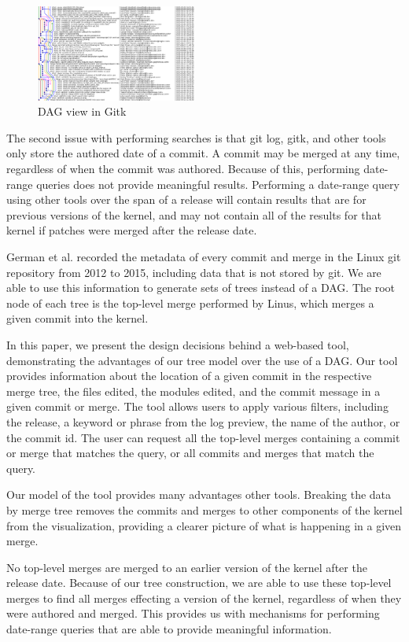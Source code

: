 \documentclass[conference, draftclsnofoot]{IEEEtran}
\begin{document}
\begin{figure}
	\centering
	\includegraphics[width=0.47\textwidth]{figures/gitk.png}
	\caption{DAG view in Gitk}
	\label{fig:gitk}
\end{figure}

The second issue with performing searches is that git log, gitk, and other
tools only store the authored date of a commit. A commit may be merged at any
time, regardless of when the commit was authored. Because of this, performing
date-range queries does not provide meaningful results. Performing a date-range
query using other tools over the span of a release will contain results that
are for previous versions of the kernel, and may not contain all of the results
for that kernel if patches were merged after the release date.

German et al. recorded the metadata of every commit and merge in the Linux git
repository from 2012 to 2015, including data that is not stored by git. We are
able to use this information to generate sets of trees instead of a DAG. The
root node of each tree is the top-level merge performed by Linus, which merges
a given commit into the kernel.

In this paper, we present the design decisions behind a web-based tool,
demonstrating the advantages of our tree model over the use of a DAG. Our tool
provides information about the location of a given commit in the respective
merge tree, the files edited, the modules edited, and the commit message in a
given commit or merge. The tool allows users to apply various filters, including
the release, a keyword or phrase from the log preview, the name of the author,
or the commit id. The user can request all the top-level merges containing a
commit or merge that matches the query, or all commits and merges that match
the query.

Our model of the tool provides many advantages other tools. Breaking the data
by merge tree removes the commits and merges to other components of the kernel
from the visualization, providing a clearer picture of what is happening in a
given merge.

No top-level merges are merged to an earlier version of the kernel after the
release date. Because of our tree construction, we are able to use these
top-level merges to find all merges effecting a version of the kernel,
regardless of when they were authored and merged. This provides us with
mechanisms for performing date-range queries that are able to provide
meaningful information.
\end{document}
